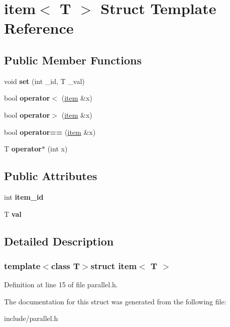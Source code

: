 \hypertarget{structitem}{\section{item$<$ T $>$ Struct Template Reference}
\label{structitem}
}
\subsection*{Public Member Functions}
\begin{DoxyCompactItemize}
\item 
\hypertarget{structitem_a11c429a8496a2790382e8fe71b285946}{void {\bfseries set} (int \+\_\+id, T \+\_\+val)}\label{structitem_a11c429a8496a2790382e8fe71b285946}

\item 
\hypertarget{structitem_a4c8fccf2fd7e71a903fc7ce4fd4cc9a4}{bool {\bfseries operator$<$} (\hyperlink{structitem}{item} \&x)}\label{structitem_a4c8fccf2fd7e71a903fc7ce4fd4cc9a4}

\item 
\hypertarget{structitem_a81f11eaec65623f112f3622bf80f0398}{bool {\bfseries operator$>$} (\hyperlink{structitem}{item} \&x)}\label{structitem_a81f11eaec65623f112f3622bf80f0398}

\item 
\hypertarget{structitem_abdb97b54674f6f25c840ec87b66530ba}{bool {\bfseries operator==} (\hyperlink{structitem}{item} \&x)}\label{structitem_abdb97b54674f6f25c840ec87b66530ba}

\item 
\hypertarget{structitem_a8009fa4c95b13066ff7b055e1bb571ea}{T {\bfseries operator$\ast$} (int x)}\label{structitem_a8009fa4c95b13066ff7b055e1bb571ea}

\end{DoxyCompactItemize}
\subsection*{Public Attributes}
\begin{DoxyCompactItemize}
\item 
\hypertarget{structitem_a14e5b02b14a0f5141dd10b36b8a3fadd}{int {\bfseries item\+\_\+id}}\label{structitem_a14e5b02b14a0f5141dd10b36b8a3fadd}

\item 
\hypertarget{structitem_a34c1d45212eced8d7b722b687a6f279b}{T {\bfseries val}}\label{structitem_a34c1d45212eced8d7b722b687a6f279b}

\end{DoxyCompactItemize}


\subsection{Detailed Description}
\subsubsection*{template$<$class T$>$struct item$<$ T $>$}



Definition at line 15 of file parallel.\+h.



The documentation for this struct was generated from the following file\+:\begin{DoxyCompactItemize}
\item 
include/parallel.\+h\end{DoxyCompactItemize}
